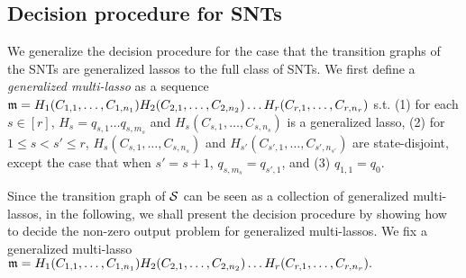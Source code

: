 %
%
%
%

\subsection{Decision procedure for SNTs}\label{sec-gflat}

We generalize the decision procedure for the case that the transition graphs of the SNTs are generalized lassos to the full class of SNTs.
We first define a \emph{generalized multi-lasso} as a sequence $\mathfrak{m}= H_1 (C_{1,1},\dots,C_{1,n_1}) H_2 (C_{2,1},\dots,C_{2,n_2}) \dots H_r (C_{r,1},\dots, C_{r, n_r})$ s.t. (1) for each $s\in[r]$, $H_s = q_{s,1} \dots q_{s, m_s}$ and $H_s (C_{s,1},\dots,C_{s, n_s})$ is a generalized lasso, (2) for $1 \leq s< s' \leq r$, $H_s (C_{s,1},\dots,C_{s, n_s})$ and $H_{s'} (C_{s', 1},\dots,C_{s', n_{s'}})$ are state-disjoint, except the case that when $s'=s+1$, $q_{s, m_s}=q_{s',1}$, and (3) $q_{1,1}=q_0$.

Since the transition graph of ${\mathcal{S} }$ can be seen as a collection of generalized multi-lassos, in the following, we shall present the decision procedure by showing how to decide the non-zero output problem for generalized multi-lassos. We fix a generalized multi-lasso
$\mathfrak{m}= H_1 (C_{1,1},\dots,C_{1,n_1}) H_2 (C_{2,1},\dots,C_{2,n_2}) \dots H_r (C_{r,1},\dots, C_{r, n_r}).$

